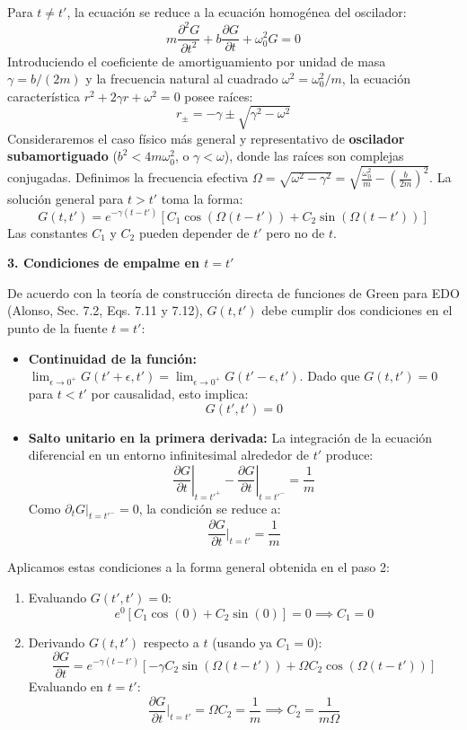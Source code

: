 \documentclass[a4paper]{article}
\begin{document}
Para $t \neq t'$, la ecuación se reduce a la ecuación homogénea del oscilador:
$$ m \frac{\partial^2 G}{\partial t^2} + b \frac{\partial G}{\partial t} + \omega_0^2 G = 0 $$
Introduciendo el coeficiente de amortiguamiento por unidad de masa $\gamma = b/(2m)$ y la frecuencia natural al cuadrado $\omega^2 = \omega_0^2/m$, la ecuación característica $r^2 + 2\gamma r + \omega^2 = 0$ posee raíces:
$$ r_{\pm} = -\gamma \pm \sqrt{\gamma^2 - \omega^2} $$
Consideraremos el caso físico más general y representativo de \textbf{oscilador subamortiguado} ($b^2 < 4m\omega_0^2$, o $\gamma < \omega$), donde las raíces son complejas conjugadas. Definimos la frecuencia efectiva $\Omega = \sqrt{\omega^2 - \gamma^2} = \sqrt{\frac{\omega_0^2}{m} - \left(\frac{b}{2m}\right)^2}$. La solución general para $t > t'$ toma la forma:
$$ G(t, t') = e^{-\gamma(t-t')} \left[ C_1 \cos\left( \Omega(t-t') \right) + C_2 \sin\left( \Omega(t-t') \right) \right] $$
Las constantes $C_1$ y $C_2$ pueden depender de $t'$ pero no de $t$.

\textbf{3. Condiciones de empalme en $t = t'$}

De acuerdo con la teoría de construcción directa de funciones de Green para EDO (Alonso, Sec. 7.2, Eqs. 7.11 y 7.12), $G(t, t')$ debe cumplir dos condiciones en el punto de la fuente $t=t'$:
\begin{itemize}
\item \textbf{Continuidad de la función:} $\lim_{\epsilon \to 0^+} G(t'+\epsilon, t') = \lim_{\epsilon \to 0^+} G(t'-\epsilon, t')$. Dado que $G(t, t')=0$ para $t<t'$ por causalidad, esto implica:
$$ G(t', t') = 0 $$
\item \textbf{Salto unitario en la primera derivada:} La integración de la ecuación diferencial en un entorno infinitesimal alrededor de $t'$ produce:
$$ \left. \frac{\partial G}{\partial t} \right|_{t=t'^+} - \left. \frac{\partial G}{\partial t} \right|_{t=t'^-} = \frac{1}{m} $$
Como $\partial_t G|_{t=t'^-} = 0$, la condición se reduce a:
$$ \frac{\partial G}{\partial t}\bigg|_{t=t'} = \frac{1}{m} $$
\end{itemize}

Aplicamos estas condiciones a la forma general obtenida en el paso 2:
\begin{enumerate}
\item Evaluando $G(t', t') = 0$:
$$ e^{0} \left[ C_1 \cos(0) + C_2 \sin(0) \right] = 0 \implies C_1 = 0 $$
\item Derivando $G(t, t')$ respecto a $t$ (usando ya $C_1=0$):
$$ \frac{\partial G}{\partial t} = e^{-\gamma(t-t')} \left[ -\gamma C_2 \sin(\Omega(t-t')) + \Omega C_2 \cos(\Omega(t-t')) \right] $$
Evaluando en $t=t'$:
$$ \frac{\partial G}{\partial t}\bigg|_{t=t'} = \Omega C_2 = \frac{1}{m} \implies C_2 = \frac{1}{m\Omega} $$
\end{enumerate}
\end{document}
